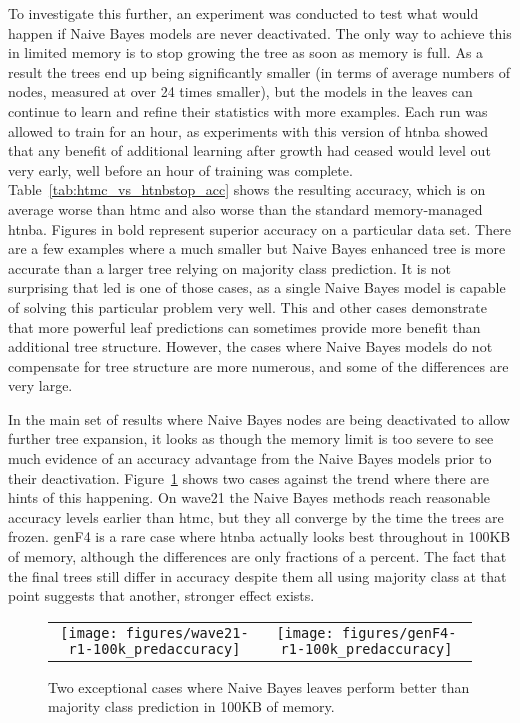 To investigate this further, an experiment was conducted to test what would happen if Naive Bayes models are never deactivated. The only way to achieve this in limited memory is to stop growing the tree as soon as memory is full. As a result the trees end up being significantly smaller (in terms of average numbers of nodes, measured at over 24 times smaller), but the models in the leaves can continue to learn and refine their statistics with more examples.
Each run was allowed to train for an hour, as experiments with this version of {\sc htnba} showed that any benefit of additional learning after growth had ceased would level out very early, well before an hour of training was complete. 
Table~\ref{tab:htmc_vs_htnbstop_acc} shows the resulting accuracy, which is on average worse than {\sc htmc} and also worse than the standard memory-managed {\sc htnba}. Figures in bold represent superior accuracy on a particular data set. There are a few examples where a much smaller but Naive Bayes enhanced tree is more accurate than a larger tree relying on majority class prediction. It is not surprising that {\sc led} is one of those cases, as a single Naive Bayes model is capable of solving this particular problem very well. This and other cases demonstrate that more powerful leaf predictions can sometimes provide more benefit than additional tree structure. However, the cases where Naive Bayes models do not compensate for tree structure are more numerous, and some of the differences are very large.

In the main set of results where Naive Bayes nodes are being deactivated to allow further tree expansion, it looks as though the memory limit is too severe to see much evidence of an accuracy advantage from the Naive Bayes models prior to their deactivation. Figure~\ref{fig:100K_NB_win} shows two cases against the trend where there are hints of this happening. On {\sc wave21} the Naive Bayes methods reach reasonable accuracy levels earlier than {\sc htmc}, but they all converge by the time the trees are frozen. {\sc genF4} is a rare case where {\sc htnba} actually looks best throughout in 100KB of memory, although the differences are only fractions of a percent. The fact that the final trees still differ in accuracy despite them all using majority class at that point suggests that another, stronger effect exists.

\begin{figure}
\centering
\begin{tabular}{c@{}c}
\texttt{[image: figures/wave21-r1-100k\_predaccuracy]} &
\texttt{[image: figures/genF4-r1-100k\_predaccuracy]} \\
\end{tabular}
\caption{Two exceptional cases where Naive Bayes leaves perform better than majority class prediction in 100KB of memory.}
\label{fig:100K_NB_win}
\end{figure}

